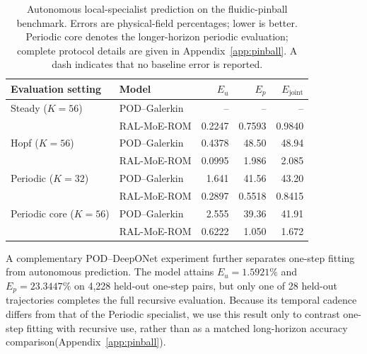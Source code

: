 \begin{table}[htbp]
\centering
\caption{
Autonomous local-specialist prediction on the fluidic-pinball benchmark. Errors are physical-field percentages; lower is better. Periodic core denotes the longer-horizon periodic evaluation; complete protocol details are given in Appendix~\ref{app:pinball}. A dash indicates that no baseline error is reported.
}
\label{tab:pinball_autonomous}
\small
\setlength{\tabcolsep}{5pt}
\begin{tabular}{@{}llrrr@{}}
\toprule
Evaluation setting & Model & $E_u$ & $E_p$ & $E_{\mathrm{joint}}$ \\
\midrule
Steady ($K=56$)
& POD--Galerkin
& -- & -- & -- \\
& RAL-MoE-ROM
& 0.2247 & 0.7593 & 0.9840 \\
\addlinespace

Hopf ($K=56$)
& POD--Galerkin
& 0.4378 & 48.50 & 48.94 \\
& RAL-MoE-ROM
& 0.0995 & 1.986 & 2.085 \\
\addlinespace

Periodic ($K=32$)
& POD--Galerkin
& 1.641 & 41.56 & 43.20 \\
& RAL-MoE-ROM
& 0.2897 & 0.5518 & 0.8415 \\
\addlinespace

Periodic core ($K=56$)
& POD--Galerkin
& 2.555 & 39.36 & 41.91 \\
& RAL-MoE-ROM
& 0.6222 & 1.050 & 1.672 \\
\bottomrule
\end{tabular}
\end{table}

A complementary POD--DeepONet experiment further separates one-step fitting from autonomous prediction.
The model attains $E_u=1.5921\%$ and $E_p=23.3447\%$ on 4,228 held-out one-step pairs, but only one of 28 held-out trajectories completes the full recursive evaluation. Because its temporal cadence differs from that of the Periodic specialist, we use this result only to contrast one-step fitting with recursive use, rather than as a matched long-horizon accuracy comparison(Appendix~\ref{app:pinball}).





